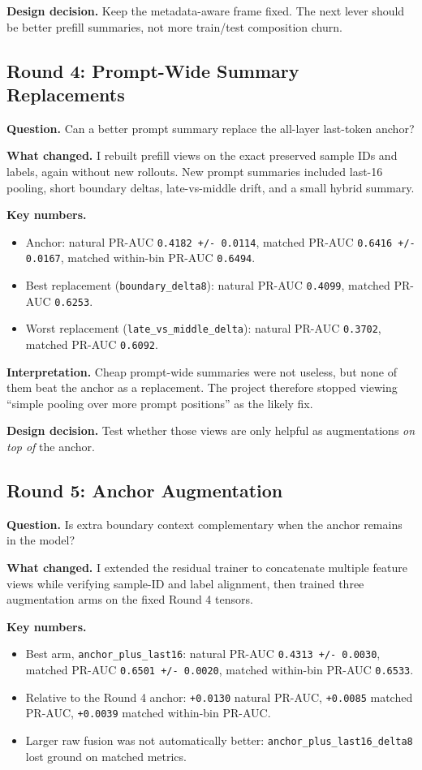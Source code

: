 \documentclass[11pt]{article}
\begin{document}
\textbf{Design decision.} Keep the metadata-aware frame fixed. The next lever should be better prefill summaries, not more train/test composition churn.

\subsection*{Round 4: Prompt-Wide Summary Replacements}
\textbf{Question.} Can a better prompt summary replace the all-layer last-token anchor?

\textbf{What changed.} I rebuilt prefill views on the exact preserved sample IDs and labels, again without new rollouts. New prompt summaries included last-16 pooling, short boundary deltas, late-vs-middle drift, and a small hybrid summary.

\textbf{Key numbers.}
\begin{itemize}
  \item Anchor:
    natural PR-AUC \texttt{0.4182 +/- 0.0114},
    matched PR-AUC \texttt{0.6416 +/- 0.0167},
    matched within-bin PR-AUC \texttt{0.6494}.
  \item Best replacement (\texttt{boundary\_delta8}):
    natural PR-AUC \texttt{0.4099},
    matched PR-AUC \texttt{0.6253}.
  \item Worst replacement (\texttt{late\_vs\_middle\_delta}):
    natural PR-AUC \texttt{0.3702},
    matched PR-AUC \texttt{0.6092}.
\end{itemize}

\textbf{Interpretation.} Cheap prompt-wide summaries were not useless, but none of them beat the anchor as a replacement. The project therefore stopped viewing ``simple pooling over more prompt positions'' as the likely fix.

\textbf{Design decision.} Test whether those views are only helpful as augmentations \emph{on top of} the anchor.

\subsection*{Round 5: Anchor Augmentation}
\textbf{Question.} Is extra boundary context complementary when the anchor remains in the model?

\textbf{What changed.} I extended the residual trainer to concatenate multiple feature views while verifying sample-ID and label alignment, then trained three augmentation arms on the fixed Round 4 tensors.

\textbf{Key numbers.}
\begin{itemize}
  \item Best arm, \texttt{anchor\_plus\_last16}:
    natural PR-AUC \texttt{0.4313 +/- 0.0030},
    matched PR-AUC \texttt{0.6501 +/- 0.0020},
    matched within-bin PR-AUC \texttt{0.6533}.
  \item Relative to the Round 4 anchor:
    \texttt{+0.0130} natural PR-AUC,
    \texttt{+0.0085} matched PR-AUC,
    \texttt{+0.0039} matched within-bin PR-AUC.
  \item Larger raw fusion was not automatically better:
    \texttt{anchor\_plus\_last16\_delta8} lost ground on matched metrics.
\end{itemize}
\end{document}
